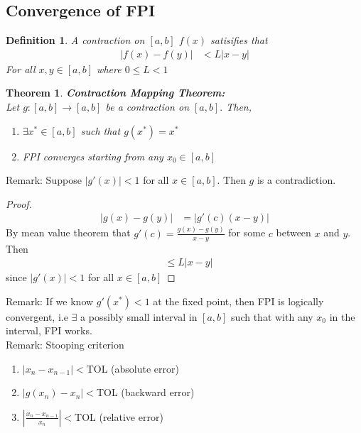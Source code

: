 \documentclass[11pt,oneside]{book}
\theoremstyle{break}
\theoremstyle{break}
\newtheorem{thm}{Theorem}[section]
\newtheorem{defn}{Definition}[corL]
\newcommand{\remark}{\color{blue}Remark: \color{black}}
\begin{document}
\subsection[Convergence of FPI]{Convergence of FPI}
\begin{defn}
A contraction on $[a,b]$ $f(x)$ satisifies that \begin{align*}
|f(x)-f(y)|&<L|x-y|
\end{align*}
For all $x,y\in [a,b]$ where $0\leq L<1$
\end{defn}
\begin{thm}
\textbf{Contraction Mapping Theorem:}\\
Let $g:[a,b]\to [a,b]$ be a contraction on $[a,b].$ Then, \begin{enumerate}
\item $\exists x^*\in [a,b]$ such that $g(x^*)=x^*$
\item FPI converges starting from any $x_0\in [a,b]$
\end{enumerate}
\end{thm}
\remark Suppose $|g'(x)|<1$ for all $x\in [a,b]$. Then $g$ is a contradiction.
\begin{proof}
\begin{align*}
|g(x)-g(y)|&=|g'(c)(x-y)|
\end{align*}
By mean value theorem that $g'(c)=\frac{g(x)-g(y)}{x-y}$ for some $c$ between $x$ and $y$. Then \begin{align*}
&\leq L|x-y|
\end{align*}
since $|g'(x)|<1$ for all $x\in [a,b]$
\end{proof}
\remark If we know $g'(x^*)<1$ at the fixed point, then FPI is logically convergent, i.e $\exists$ a possibly small interval in $[a,b]$ such that with any $x_0$ in the interval, FPI works.\\
\remark Stooping criterion \begin{enumerate}
\item $|x_n-x_{n-1}|<$TOL (absolute error)
\item $|g(x_n)-x_n|<$TOL (backward error)
\item $\left|\frac{x_n-x_{n-1}}{x_n} \right|<$TOL (relative error)
\end{enumerate}
\end{document}
